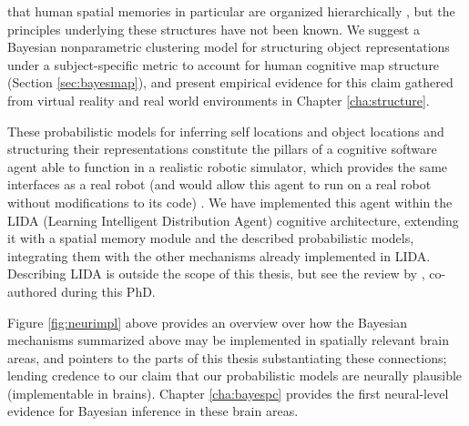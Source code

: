 \clearpage

\noindent that human spatial memories in particular are organized hierarchically \citep{hirtle1985evidence, mcnamara1989subjective, greenauer2010micro}, but the principles underlying these structures have not been known. We suggest a Bayesian nonparametric clustering model for structuring object representations under a subject-specific metric to account for human cognitive map structure (Section \ref{sec:bayesmap}), and present empirical evidence for this claim gathered from virtual reality and real world environments in Chapter \ref{cha:structure}.




These probabilistic models for inferring self locations and object locations and structuring their representations constitute the pillars of a cognitive software agent able to function in a realistic robotic simulator, which provides the same interfaces as a real robot (and would allow this agent to run on a real robot without modifications to its code) \citep{rusu2007extending}. We have implemented this agent within the LIDA (Learning Intelligent Distribution Agent) cognitive architecture, extending it with a spatial memory module and the described probabilistic models, integrating them with the other mechanisms already implemented in LIDA. Describing LIDA is outside the scope of this thesis, but see the review by \cite{franklin2013lida}, co-authored during this PhD.

Figure \ref{fig:neurimpl} above provides an overview over how the Bayesian mechanisms summarized above may be implemented in spatially relevant brain areas, and pointers to the parts of this thesis substantiating these connections; lending credence to our claim that our probabilistic models are neurally plausible (implementable in brains). Chapter \ref{cha:bayespc} provides the first neural-level evidence for Bayesian inference in these brain areas. 


